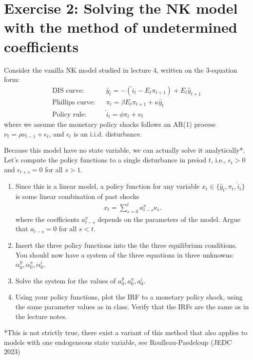 \documentclass[11pt]{article}
\newcommand{\ben}{\begin{enumerate}}
\newcommand{\een}{\end{enumerate}}
\begin{document}
\section*{Exercise 2: Solving the NK model with the method of undetermined coefficients}
Consider the vanilla NK model studied in lecture 4, written on the 3-equation form:
\begin{eqnarray}
\text{DIS curve:} && \hat y_t = - (\hat i_t-E_t \pi_{t+1}) + E_t \hat y_{t+1} \nonumber \\
\text{Phillips curve:} && \pi_t = \beta E_t \pi_{t+1} + \kappa \hat y_t \nonumber \\
\text{Policy rule:} && \hat i_t = \phi \pi_t + \nu_t \nonumber 
\end{eqnarray}
where we assume the monetary policy shocks follows an AR(1) process $\nu_t = \rho \nu_{t-1} + \epsilon_t$, and $\epsilon_t$ is an i.i.d. disturbance.

Because this model have no state variable, we can actually solve it analytically*. Let's compute the policy functions to a single disturbance in preiod $t$, i.e., $\epsilon_t>0$ and $\epsilon_{t+s}=0$ for all $s>1$.
\ben
	\item Since this is a linear model, a policy function for any variable $x_t \in \{\hat y_t, \pi_t, \hat i_t \}$ is some linear combination of past shocks 
	\begin{eqnarray}
	x_t = \sum_{s=0}^{t} a^x_{t-s} \nu_s. \nonumber
	\end{eqnarray}
	where the coefficients $a^x_{t-s}$ depends on the parameters of the model. Argue that $a_{t-s}=0$ for all $s<t$.
	
	\item Insert the three policy functions into the the three equilibrium conditions. You should now have a system of the three equations in three unknowns: $\alpha_0^y, \alpha_0^\pi, \alpha_0^i$.

	\item Solve the system for the values of $a_0^y, a_0^\pi, a_0^i$.
	
	\item Using your policy functions, plot the IRF to a monetary policy shock, using the same parameter values as in class. Verify that the IRFs are the same as in the lecture notes. 
\een

*This is not strictly true, there exist a variant of this method that also applies to models with one endogeneous state variable, see Roulleau-Pasdeloup (JEDC 2023)
\end{document}
